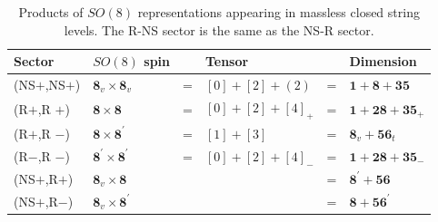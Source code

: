 	\begin{table}[ht]
		\caption{Products of $SO(8)$ representations appearing in massless closed string levels. The R-NS sector is the same as the NS-R sector.}
		\label{tab:10.3}%
		\centering
		\begin{tabular}[c]{llclcl}
			\hline\hline
			\vphantom{\Big(}Sector  & $SO(8) $ spin  & & Tensor & & Dimension \\
			\hline
			(NS$+$,NS$+$)& $\mathbf{8}_{v} \times \mathbf{8}_{v}$ & = & $[0]+[2]+(2)$ & = & $\mathbf{1}+\mathbf{8}+\mathbf{35} $\\
			(R$+$,R $+$) & $\mathbf{8} \times \mathbf{8}$ & = & $[0]+[2]+[4]_{+}$ & = & $\mathbf{1}+\mathbf{28}+\mathbf{35}_{+} $ \\
			(R$+$,R $-$)& $\mathbf{8}\times \mathbf{8}^{\prime}$ & = & $[1]+[3]$ & = & $\mathbf{8}_{v}+\mathbf{56}_{t} $ \\
			(R$-$,R $-$)& $\mathbf{8}^{\prime} \times \mathbf{8}^{\prime}$ & = & $[0]+[2]+[4]_{-}$ & = & $\mathbf{1}+\mathbf{28}+\mathbf{35}_{-} $ \\
			(NS$+$,R$+$)& $\mathbf{8}_{v} \times \mathbf{8}$ &  & & = & $ \mathbf{8}^{\prime}+\mathbf{56} $\\
			(NS$+$,R$-$)& $\mathbf{8}_{v} \times \mathbf{8}^{\prime}$ &  & & = & $ \mathbf{8}+\mathbf{56}^{\prime} $ \\
			\hline\hline
		\end{tabular}
	\end{table}
	
